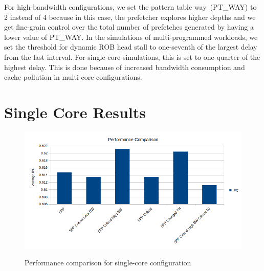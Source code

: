 For high-bandwidth configurations, we set the pattern table way~(PT\_WAY) to 2 instead of 4 because in this case, the prefetcher explores higher depths and we get fine-grain control over the total number of prefetches generated by having a lower value of PT\_WAY.
In the simulations of  multi-programmed workloads, we set the threshold for dynamic ROB head stall to one-seventh of the largest delay from the last interval. For single-core simulations, this is set to one-quarter of the highest delay. This is done because of increased bandwidth consumption and cache pollution in multi-core configurations. 

\section{Single Core Results}
\begin{figure}[H]
{\includegraphics[scale=0.5]{images/IPC_single.png}}
\caption{Performance comparison for single-core configuration}
\label{fig:single-core-perf}
\end{figure}

